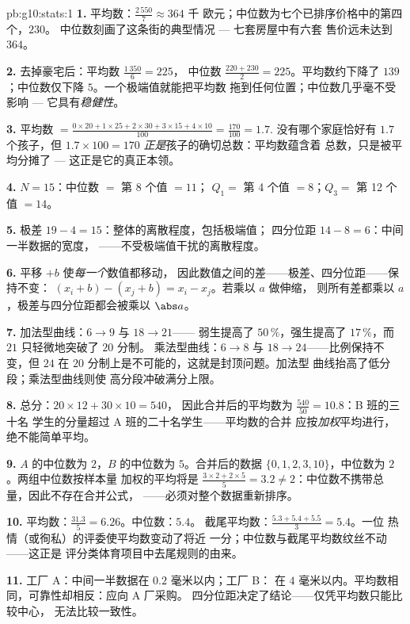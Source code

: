 \begin{solution}{pb:g10:stats:1}
\textbf{1.} 平均数：$\frac{2\,550}{7} \approx 364$ 千
欧元；中位数为七个已排序价格中的第四个，$230$。
中位数刻画了这条街的典型情况 --- 七套房屋中有六套
售价远未达到 $364$。

\textbf{2.} 去掉豪宅后：平均数 $\frac{1\,350}{6} = 225$，
中位数 $\frac{220 + 230}{2} = 225$。平均数约下降了
$139$；中位数仅下降 $5$。一个极端值就能把平均数
拖到任何位置；中位数几乎毫不受影响 --- 它具有\emph{稳健性}。

\textbf{3.} 平均数 $= \frac{0 \times 20 + 1 \times 25 + 2 \times
30 + 3 \times 15 + 4 \times 10}{100} = \frac{170}{100} = 1.7$.
没有哪个家庭恰好有 $1.7$ 个孩子，但 $1.7 \times 100 = 170$
\emph{正是}孩子的确切总数：平均数蕴含着
总数，只是被平均分摊了 --- 这正是它的真正本领。

\textbf{4.} $N = 15$：中位数 $=$ 第 8 个值 $= 11$；
$Q_1 =$ 第 4 个值 $= 8$；$Q_3 =$ 第 12 个值 $= 14$。

\textbf{5.} 极差 $19 - 4 = 15$：整体的离散程度，包括极端值；
四分位距 $14 - 8 = 6$：中间一半数据的宽度，
——不受极端值干扰的离散程度。

\textbf{6.} 平移 $+b$ 使\emph{每一个}数值都移动，
因此数值之间的差——极差、四分位距——保持不变：
$(x_i + b) - (x_j + b) = x_i - x_j$。若乘以 $a$ 做伸缩，
则所有差都乘以 $a$，极差与四分位距都会被乘以
$\abs a$。

\textbf{7.} 加法型曲线：$6 \to 9$ 与 $18 \to 21$——
弱生提高了 $50\,\%$，强生提高了 $17\,\%$，而 $21$
只轻微地突破了 $20$ 分制。
乘法型曲线：$6 \to 8$ 与 $18 \to 24$——比例保持不变，但 $24$ 在
$20$ 分制上是不可能的，这就是封顶问题。加法型
曲线抬高了低分段；乘法型曲线则使
高分段冲破满分上限。

\textbf{8.} 总分：$20 \times 12 + 30 \times 10 = 540$，
因此合并后的平均数为 $\frac{540}{50} = 10.8$：B 班的三十名
学生的分量超过 A 班的二十名学生——平均数的合并
应按\emph{加权}平均进行，绝不能简单平均。

\textbf{9.} $A$ 的中位数为 $2$，$B$ 的中位数为 $5$。合并后的数据
$\{0, 1, 2, 3, 10\}$，中位数为 $2$。两组中位数按样本量
加权的平均将是 $\frac{3 \times 2 + 2 \times 5}{5} = 3.2
\neq 2$：中位数不携带总量，因此不存在合并公式，
——必须对整个数据重新排序。

\textbf{10.} 平均数：$\frac{31.3}{5} = 6.26$。中位数：$5.4$。
截尾平均数：$\frac{5.3 + 5.4 + 5.5}{3} = 5.4$。一位
热情（或徇私）的评委使平均数变动了将近
一分；中位数与截尾平均数纹丝不动——这正是
评分类体育项目中去尾规则的由来。

\textbf{11.} 工厂 A：中间一半数据在 $0.2$ 毫米以内；工厂 B：
在 $4$ 毫米以内。平均数相同，可靠性却相反：应向 A 厂采购。
四分位距决定了结论——仅凭平均数只能比较中心，
无法比较一致性。


\end{solution}
